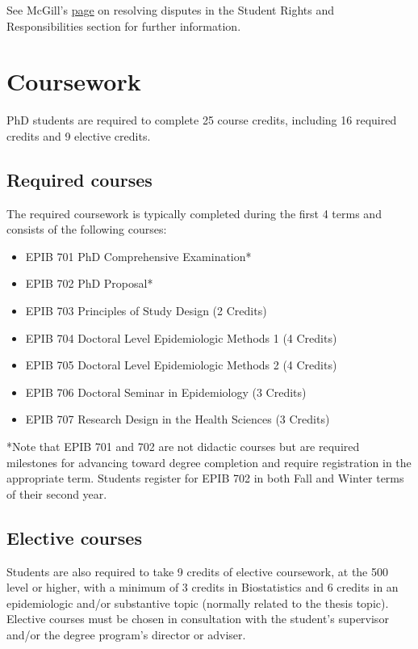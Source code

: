 \documentclass[
  openany]{book}
\providecommand{\tightlist}{%
  \setlength{\itemsep}{0pt}\setlength{\parskip}{0pt}}
\begin{document}
See McGill's \href{www.mcgill.ca/students/srr/disputes}{page} on resolving disputes in the Student Rights and Responsibilities section for further information.

\hypertarget{coursework}{%
\chapter{Coursework}\label{coursework}}

PhD students are required to complete 25 course credits, including 16 required credits and 9 elective credits.

\hypertarget{required-courses}{%
\section{Required courses}\label{required-courses}}

The required coursework is typically completed during the first 4 terms and consists of the following courses:

\begin{itemize}
\tightlist
\item
  EPIB 701 PhD Comprehensive Examination*
\item
  EPIB 702 PhD Proposal*
\item
  EPIB 703 Principles of Study Design (2 Credits)
\item
  EPIB 704 Doctoral Level Epidemiologic Methods 1 (4 Credits)
\item
  EPIB 705 Doctoral Level Epidemiologic Methods 2 (4 Credits)
\item
  EPIB 706 Doctoral Seminar in Epidemiology (3 Credits)
\item
  EPIB 707 Research Design in the Health Sciences (3 Credits)
\end{itemize}

*Note that EPIB 701 and 702 are not didactic courses but are required milestones for advancing toward degree completion and require registration in the appropriate term. Students register for EPIB 702 in both Fall and Winter terms of their second year.

\hypertarget{elective-courses}{%
\section{Elective courses}\label{elective-courses}}

Students are also required to take 9 credits of elective coursework, at the 500 level or higher, with a minimum of 3 credits in Biostatistics and 6 credits in an epidemiologic and/or substantive topic (normally related to the thesis topic). Elective courses must be chosen in consultation with the student's supervisor and/or the degree program's director or adviser.
\end{document}

